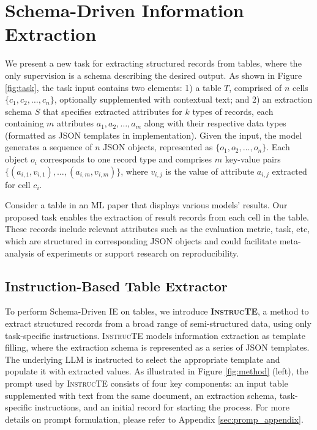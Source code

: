 \documentclass[11pt]{article}
\newcommand\method{\textsc{InstrucTE}}
\begin{document}
\section{Schema-Driven Information Extraction}
\label{sec:task_def}

We present a new task for extracting structured records from tables, where the only supervision is a schema describing the desired output.
As shown in Figure \ref{fig:task}, the task input contains two elements: 1) a table $T$, comprised of $n$ cells $\{c_1, c_2, \dots, c_n\}$, optionally supplemented with contextual text;  and 2) an extraction schema $S$ that specifies extracted attributes for $k$ types of records, each containing $m$ attributes ${a_1, a_2, \dots, a_m}$ along with their respective data types (formatted as JSON templates in implementation). 
Given the input, the model generates a sequence of $n$ JSON objects, represented as $\{o_1, o_2, \dots, o_n\}$. Each object $o_i$ corresponds to one record type and comprises $m$ key-value pairs $\{(a_{i,1}, v_{i,1}), \dots, (a_{i,m}, v_{i,m})\}$, where $v_{i,j}$ is the value of attribute $a_{i,j}$ extracted for cell $c_i$. 


Consider a table in an ML paper that displays various models' results.
Our proposed task enables the extraction of result records from each cell in the table.  These records include relevant attributes such as the evaluation metric, task, etc, which are structured in corresponding JSON objects and could facilitate meta-analysis of experiments or support research on reproducibility.







\subsection{Instruction-Based Table Extractor}
\label{sec:task}








To perform Schema-Driven IE on tables, we introduce \textbf{\method{}}, a method to extract structured records from a broad range of semi-structured data, using only task-specific instructions.
\method{} models information extraction as template filling, where the extraction schema is represented as a series of JSON templates. The underlying LLM is instructed to select the appropriate template and populate it with extracted values. As illustrated in Figure \ref{fig:method} (left), the prompt used by \method{} consists of four key components: an input table supplemented with text from the same document, an extraction schema, task-specific instructions, and an initial record for starting the process. For more details on prompt formulation, please refer to Appendix \ref{sec:promp_appendix}. 
\end{document}
